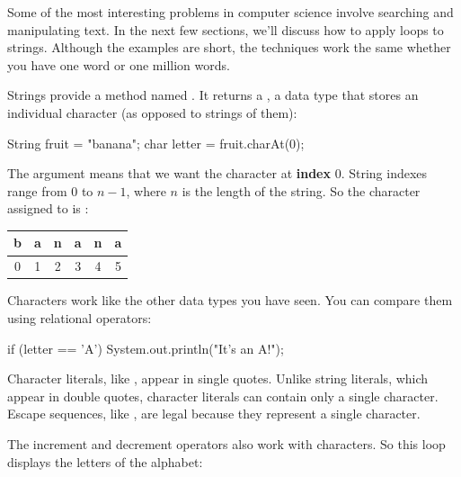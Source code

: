 Some of the most interesting problems in computer science involve searching and manipulating text.
In the next few sections, we'll discuss how to apply loops to strings.
Although the examples are short, the techniques work the same whether you have one word or one million words.


Strings provide a method named .
It returns a , a data type that stores an individual character (as opposed to strings of them):

\begin{code}
String fruit = "banana";
char letter = fruit.charAt(0);
\end{code}

The argument  means that we want the character at {\bf index} 0.
String indexes range from 0 to $n-1$, where $n$ is the length of the string.
So the character assigned to  is :

\begin{center}
\ttfamily
\begin{tabular}{cccccc}
\hline
\multicolumn{1}{|l|}{b} & \multicolumn{1}{l|}{a} & \multicolumn{1}{l|}{n} & \multicolumn{1}{l|}{a} & \multicolumn{1}{l|}{n} & \multicolumn{1}{l|}{a} \\ \hline
0                       & 1                      & 2                      & 3                      & 4                      & 5
\end{tabular}
\end{center}

Characters work like the other data types you have seen.
You can compare them using relational operators:

\begin{code}
if (letter == 'A') {
    System.out.println("It's an A!");
}
\end{code}


Character literals, like , appear in single quotes.
Unlike string literals, which appear in double quotes, character literals can contain only a single character.
Escape sequences, like , are legal because they represent a single character.

The increment and decrement operators also work with characters.
So this loop displays the letters of the alphabet:

